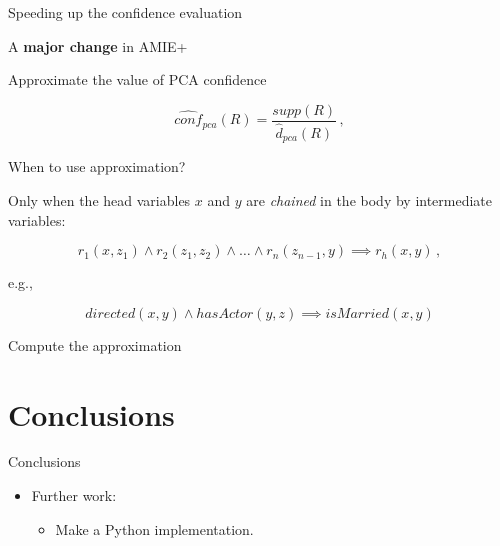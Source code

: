 \documentclass[xcolor={x11names}]{beamer}
\begin{document}
\begin{frame}{Speeding up the confidence evaluation}

    \begin{block}{}
        A \textbf{major change} in AMIE+ 
	\end{block}

    \begin{block}{Approximate the value of PCA confidence}
	\end{block}

    \begin{equation}
        \label{eq:approx_stand_conf}
        \widehat{conf}_{pca}(R) = \dfrac{supp(R)}{\widehat{d}_{pca}(R)}\,,
    \end{equation}

\end{frame}

\begin{frame}{When to use approximation?}
    \begin{block}{}
        Only when the head variables $x$ and $y$ are \textit{chained}
        in the body by intermediate variables:
	\end{block}
    \begin{equation}
        \label{eq:candidate_for_approx}
        r_1(x, z_1) \land r_2(z_1, z_2) \land \ldots \land r_n(z_{n-1}, y) \implies r_h(x, y)\,,
    \end{equation}

    e.g.,

    \begin{equation}
        directed(x, y) \land hasActor(y, z) \implies isMarried(x, y)
    \end{equation}

\end{frame}

\begin{frame}{Compute the approximation}
\end{frame}

\section{Conclusions}

\begin{frame}{Conclusions}
	\begin{itemize}
   		\item Further work:
	    \begin{itemize}
   		    \item Make a Python implementation.
	    \end{itemize}
	\end{itemize}
\end{frame}
\end{document}

